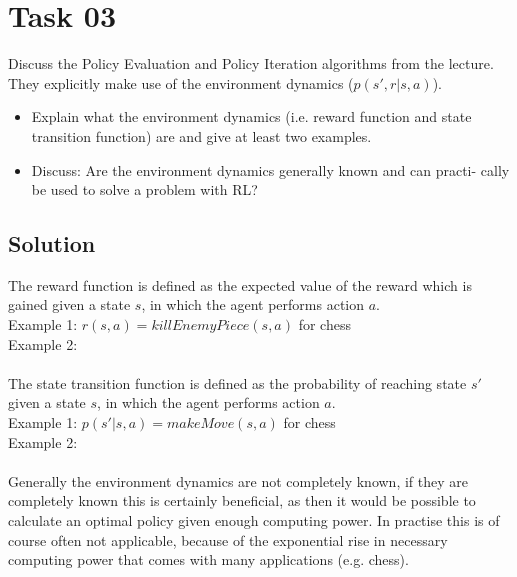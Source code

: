 \documentclass[a4paper,12pt]{scrartcl}
\begin{document}
\section*{Task 03}
Discuss the Policy Evaluation and Policy Iteration algorithms from the lecture.
They explicitly make use of the environment dynamics ($p(s', r|s, a)$).
\begin{itemize}
\item Explain what the environment dynamics (i.e. reward function and state
transition function) are and give at least two examples.
\item Discuss: Are the environment dynamics generally known and can practi-
cally be used to solve a problem with RL?
\end{itemize}

\subsection*{Solution}

The reward function is defined as the expected value of the reward which is gained given a state $s$, in which the agent performs action $a$.\\
\indent Example 1: $r(s,a) = killEnemyPiece(s,a)$ for chess\\
\indent Example 2: \\\\
The state transition function is defined as the probability of reaching state $s'$ given a state $s$, in which the agent performs action $a$. \\
\indent Example 1: $p(s'|s,a) = makeMove(s,a)$ for chess\\
\indent Example 2:\\\\
Generally the environment dynamics are not completely known, if they are completely known this is certainly beneficial, as then it would be possible to calculate an optimal policy given enough computing power. In practise this is of course often not applicable, because of the exponential rise in necessary computing power that comes with many applications (e.g. chess).
\end{document}
